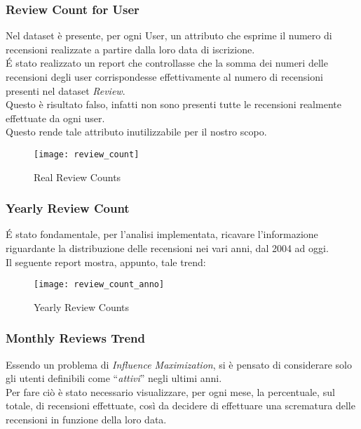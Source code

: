 \subsubsection{Review Count for User}
Nel dataset è presente, per ogni User, un attributo che esprime il numero di
recensioni realizzate a partire dalla loro data di iscrizione.\\
\'E stato realizzato un report che controllasse che la somma dei numeri  delle
recensioni degli user corrispondesse effettivamente al numero di recensioni
presenti nel dataset \textit{Review}.\\
Questo è risultato falso, infatti non sono presenti tutte le recensioni
realmente effettuate da ogni user.\\
Questo rende tale attributo inutilizzabile per il nostro scopo.\\

\begin{figure}[!htbp]
	\texttt{[image: review\_count]}
	\caption{Real Review Counts}
	\label{review_count}
\end{figure}

\subsubsection{Yearly Review Count}
\'E stato fondamentale, per l'analisi implementata, ricavare l'informazione riguardante la distribuzione delle
recensioni nei vari anni, dal 2004 ad oggi.\\
Il seguente report mostra, appunto, tale trend:\\

\begin{figure}[!htbp]
	\texttt{[image: review\_count\_anno]}
	\caption{Yearly Review Counts}
	\label{review_count_anno}
\end{figure}

\clearpage

\subsubsection{Monthly Reviews Trend}
Essendo un problema di \textit{Influence Maximization}, si è pensato di
considerare solo gli utenti definibili come ``\textit{attivi}'' negli ultimi anni.\\
Per fare ciò è stato necessario visualizzare, per ogni mese, la percentuale, sul
totale, di recensioni effettuate, così da decidere di effettuare una scrematura
delle recensioni in funzione della loro data.

